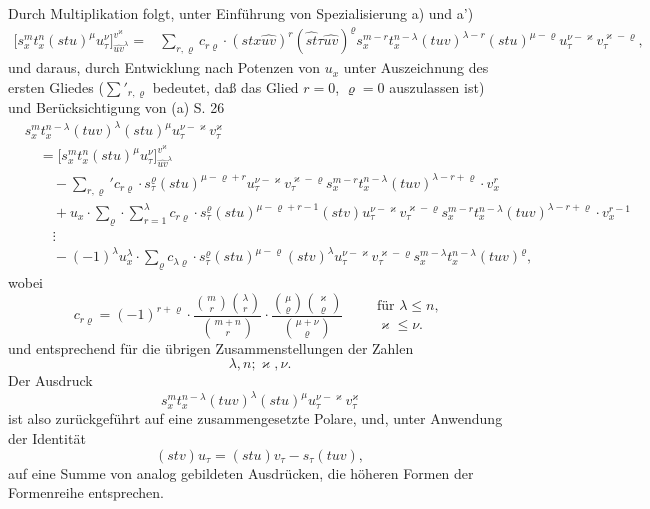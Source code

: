 Durch Multiplikation folgt, unter Einführung von Spezialisierung a) und a')
\[
\begin{aligned}
\bigl[s_x^m t_x^n(stu)^\mu u_\tau^\nu\bigr]_{\widehat{uv}^{\lambda}}^{v^\varkappa}
={}&
\sum_{r,\varrho}c_{r\varrho}\cdot
(stx\widehat{uv})^r(\widehat{st}\tau\widehat{uv})^\varrho
s_x^{m-r}t_x^{n-\lambda}(tuv)^{\lambda-r}(stu)^{\mu-\varrho}
u_\tau^{\nu-\varkappa}v_\tau^{\varkappa-\varrho},
\end{aligned}
\]
und daraus, durch Entwicklung nach Potenzen von $u_x$ unter Auszeichnung des ersten Gliedes ($\sum'_{r,\varrho}$ bedeutet, daß das Glied $r=0$, $\varrho=0$ auszulassen ist) und Berücksichtigung von (a) S. 26
\[
\tag{II}
\begin{aligned}
&s_x^m t_x^{n-\lambda}(tuv)^\lambda(stu)^\mu u_\tau^{\nu-\varkappa}v_\tau^\varkappa\\
&\quad =
\bigl[s_x^m t_x^n(stu)^\mu u_\tau^\nu\bigr]_{\widehat{uv}^{\lambda}}^{v^\varkappa}\\
&\qquad
-\sum_{r,\varrho}' c_{r\varrho}\cdot s_\tau^\varrho(stu)^{\mu-\varrho+r}
u_\tau^{\nu-\varkappa}v_\tau^{\varkappa-\varrho}
s_x^{m-r}t_x^{n-\lambda}(tuv)^{\lambda-r+\varrho}\cdot v_x^r\\
&\qquad
+u_x\cdot\sum_{\varrho}\cdot\sum_{r=1}^{\lambda} c_{r\varrho}\cdot
s_\tau^\varrho(stu)^{\mu-\varrho+r-1}(stv)
u_\tau^{\nu-\varkappa}v_\tau^{\varkappa-\varrho}
s_x^{m-r}t_x^{n-\lambda}(tuv)^{\lambda-r+\varrho}\cdot v_x^{r-1}\\
&\qquad
\vdots\\
&\qquad
-(-1)^\lambda u_x^\lambda\cdot\sum_\varrho c_{\lambda\varrho}\cdot
s_\tau^\varrho(stu)^{\mu-\varrho}(stv)^\lambda
u_\tau^{\nu-\varkappa}v_\tau^{\varkappa-\varrho}
s_x^{m-\lambda}t_x^{n-\lambda}(tuv)^\varrho,
\end{aligned}
\]
wobei
\[
c_{r\varrho}=(-1)^{r+\varrho}\cdot
\frac{\binom{m}{r}\binom{\lambda}{r}}{\binom{m+n}{r}}\cdot
\frac{\binom{\mu}{\varrho}\binom{\varkappa}{\varrho}}{\binom{\mu+\nu}{\varrho}}
\qquad
\begin{array}{l}
\text{für }\lambda\le n,\\
\varkappa\le\nu.
\end{array}
\]
und entsprechend für die übrigen Zusammenstellungen der Zahlen
\[\lambda,n;\varkappa,\nu.\]
Der Ausdruck
\[s_x^m t_x^{n-\lambda}(tuv)^\lambda(stu)^\mu u_\tau^{\nu-\varkappa}v_\tau^\varkappa\]
ist also zurückgeführt auf eine zusammengesetzte Polare, und, unter Anwendung der Identität
\[
(stv)u_\tau=(stu)v_\tau-s_\tau(tuv),
\]
auf eine Summe von analog gebildeten Ausdrücken, die höheren Formen der Formenreihe entsprechen.

